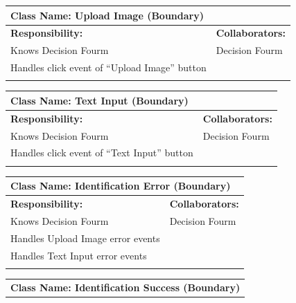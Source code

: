 \documentclass[]{article}
\begin{document}
\begin{itemize}
\begin{table}[ht]
		\centering
		\begin{tabular}{|p{6cm}|p{6cm}|}
		\hline 
		\multicolumn{2}{|l|}{\textbf{Class Name: Upload Image (Boundary)}} \\
		\hline
		\textbf{Responsibility:} & \textbf{Collaborators:} \\
		\hline
		Knows Decision Fourm & Decision Fourm \\
		Handles click event of “Upload Image” button & \\
		\vspace{1in} & \\
		\hline
		\end{tabular}
	\end{table}
	\begin{table}[ht]
		\centering
		\begin{tabular}{|p{6cm}|p{6cm}|}
		\hline 
		\multicolumn{2}{|l|}{\textbf{Class Name: Text Input (Boundary)}} \\
		\hline
		\textbf{Responsibility:} & \textbf{Collaborators:} \\
		\hline
		Knows Decision Fourm & Decision Fourm \\
		Handles click event of “Text Input” button & \\
		\vspace{1in} & \\
		\hline
		\end{tabular}
	\end{table}
	\begin{table}[ht]
		\centering
		\begin{tabular}{|p{6cm}|p{6cm}|}
		\hline 
		\multicolumn{2}{|l|}{\textbf{Class Name: Identification Error (Boundary)}} \\
		\hline
		\textbf{Responsibility:} & \textbf{Collaborators:} \\
		\hline
		Knows Decision Fourm & Decision Fourm \\
		Handles Upload Image error events & \\
		Handles Text Input error events & \\
		\vspace{1in} & \\
		\hline
		\end{tabular}
	\end{table}
	\begin{table}[ht]
		\centering
		\begin{tabular}{|p{6cm}|p{6cm}|}
		\hline 
		\multicolumn{2}{|l|}{\textbf{Class Name: Identification Success (Boundary)}} \\

\end{tabular}
\end{table}
\end{itemize}
\end{document}
